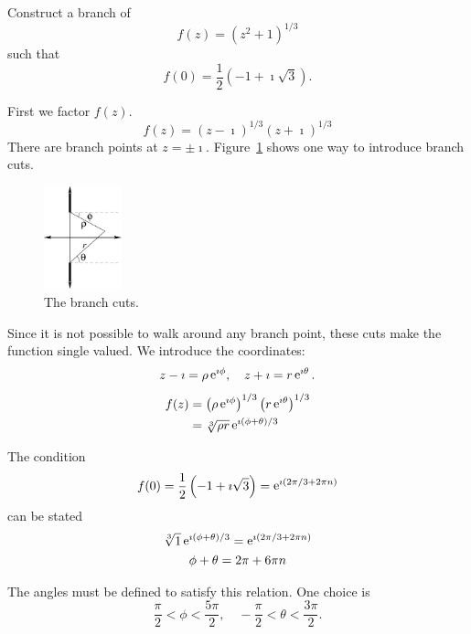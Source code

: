 \begin{Example}
  Construct a branch of
  \[ 
  f(z) = \left( z^2 + 1 \right)^{1/3} 
  \]
  such that
  \[ 
  f(0) = \frac{1}{2} \left( -1 + \imath \sqrt{3} \right). 
  \]

  First we factor $f(z)$.
  \[ 
  f(z) = (z - \imath)^{1/3}  (z + \imath)^{1/3}
  \]
  There are branch points at $z = \pm \imath$.  Figure~\ref{singvbc} 
  shows one way to introduce branch cuts.

  \begin{figure}[htb!]
    \begin{center}
      \includegraphics[width=0.2\textwidth]{fcv/function/singvbc}
    \end{center}
    \caption{The branch cuts.}
    \label{singvbc}
  \end{figure}

  Since it is not possible to walk around any branch point, these cuts make
  the function single valued.  We introduce the coordinates:
  \[
  z - \imath = \rho \mathop{\mathrm{e}}\nolimits^{\imath \phi}, \quad z + \imath = r \mathop{\mathrm{e}}\nolimits^{\imath \theta}.
  \]
  \begin{align*}
    f(z) &= \left( \rho \mathop{\mathrm{e}}\nolimits^{\imath \phi} \right)^{1/3}  \left( r \mathop{\mathrm{e}}\nolimits^{\imath \theta} \right)^{1/3} 
    \\
    &= \sqrt[3]{\rho r} \mathop{\mathrm{e}}\nolimits^{\imath (\phi+\theta)/3}
  \end{align*}

  The condition
  \[ 
  f(0) = \frac{1}{2} \left( -1 + \imath \sqrt{3} \right) = \mathop{\mathrm{e}}\nolimits^{\imath (2 \pi/3 + 2 \pi n)} 
  \]
  can be stated
  \begin{gather*}
    \sqrt[3]{1} \mathop{\mathrm{e}}\nolimits^{\imath (\phi + \theta)/3} = \mathop{\mathrm{e}}\nolimits^{\imath (2 \pi/3 + 2 \pi n)} 
    \\
    \phi + \theta = 2 \pi + 6 \pi n
  \end{gather*}

  The angles must be defined to satisfy this relation.  One choice is
  \[ 
  \boxed{ 
    \frac{\pi}{2} < \phi < \frac{5 \pi}{2}, \quad
    -\frac{\pi}{2} < \theta < \frac{3 \pi}{2}. 
    } 
  \]
\end{Example}









